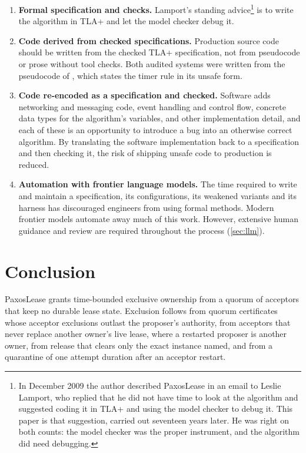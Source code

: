\documentclass[final,5p,times,twocolumn,number]{elsarticle}
\begin{document}
\begin{enumerate}\itemsep0.25em

\item \textbf{Formal specification and checks.}  Lamport's standing advice\footnote{In December 2009 the author described PaxosLease in an email to Leslie Lamport, who replied that he did not have time to look at the algorithm and suggested coding it in TLA+ and using the model checker to debug it.  This paper is that suggestion, carried out seventeen years later.  He was right on both counts: the model checker was the proper instrument, and the algorithm did need debugging.} is to write the algorithm in TLA+ and let the model checker debug it.

\item \textbf{Code derived from checked specifications.}  Production source code should be written from the checked TLA+ specification, not from pseudocode or prose without tool checks.  Both audited systems were written from the pseudocode of \cite{ref1}, which states the timer rule in its unsafe form.

\item \textbf{Code re-encoded as a specification and checked.}  Software adds networking and messaging code, event handling and control flow, concrete data types for the algorithm's variables, and other implementation detail, and each of these is an opportunity to introduce a bug into an otherwise correct algorithm.  By translating the software implementation back to a specification and then checking it, the risk of shipping unsafe code to production is reduced.

\item \textbf{Automation with frontier language models.}  The time required to write and maintain a specification, its configurations, its weakened variants and its harness has discouraged engineers from using formal methods.  Modern frontier models automate away much of this work.  However, extensive human guidance and review are required throughout the process (\ref{sec:llm}).

\end{enumerate}

\section{Conclusion}\label{sec:conclusion}

PaxosLease grants time-bounded exclusive ownership from a quorum of acceptors that keep no durable lease state.  Exclusion follows from quorum certificates whose acceptor exclusions outlast the proposer's authority, from acceptors that never replace another owner's live lease, where a restarted proposer is another owner, from release that clears only the exact instance named, and from a quarantine of one attempt duration after an acceptor restart.
\end{document}
